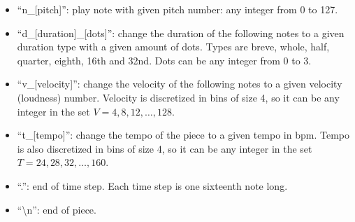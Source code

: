 





\begin{itemize}
    \item ``n\_[pitch]'': play note with given pitch number: any integer from 0 to 127.
    \item ``d\_[duration]\_[dots]'': change the duration of the following notes to a given
    duration type with a given amount of dots. Types are breve, whole, half, quarter,
    eighth, 16th and 32nd. Dots can be any integer from 0 to 3.
    \item ``v\_[velocity]'': change the velocity of the following  notes to a given velocity (loudness) number. Velocity is discretized in
    bins of size 4, so it can be any integer in the set $V = {4, 8, 12, \dots, 128}$.
    \item ``t\_[tempo]'': change the tempo of the piece to a given tempo in bpm. Tempo is also discretized in bins of size 4, so it can be any integer in the set $T = {24, 28, 32, \dots, 160}$.
    \item ``.'': end of time step. Each time step is one sixteenth note long.
    \item ``\textbackslash n'': end of piece.
\end{itemize}

